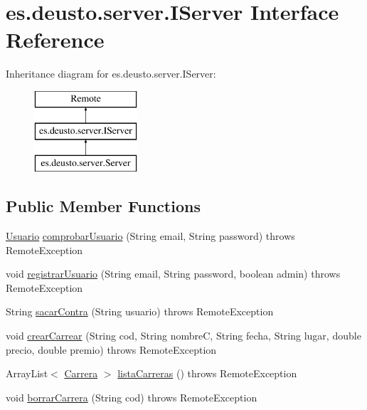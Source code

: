 \hypertarget{interfacees_1_1deusto_1_1server_1_1_i_server}{}\section{es.\+deusto.\+server.\+I\+Server Interface Reference}
\label{interfacees_1_1deusto_1_1server_1_1_i_server}
Inheritance diagram for es.\+deusto.\+server.\+I\+Server\+:\begin{figure}[H]
\begin{center}
\leavevmode
\includegraphics[height=3.000000cm]{interfacees_1_1deusto_1_1server_1_1_i_server}
\end{center}
\end{figure}
\subsection*{Public Member Functions}
\begin{DoxyCompactItemize}
\item 
\mbox{\hyperlink{classes_1_1deusto_1_1server_1_1jdo_1_1_usuario}{Usuario}} \mbox{\hyperlink{interfacees_1_1deusto_1_1server_1_1_i_server_a864d05d99ec3891208c39d8352221656}{comprobar\+Usuario}} (String email, String password)  throws Remote\+Exception
\item 
void \mbox{\hyperlink{interfacees_1_1deusto_1_1server_1_1_i_server_af6743c655c7831fa6d87e6e910bb6db4}{registrar\+Usuario}} (String email, String password, boolean admin)  throws Remote\+Exception
\item 
String \mbox{\hyperlink{interfacees_1_1deusto_1_1server_1_1_i_server_a950b819a4f67edf0ef76221dd4714d47}{sacar\+Contra}} (String usuario)  throws Remote\+Exception
\item 
void \mbox{\hyperlink{interfacees_1_1deusto_1_1server_1_1_i_server_a3cb0049dde89f2d81fcc883b19a0c6cf}{crear\+Carrear}} (String cod, String nombreC, String fecha, String lugar, double precio, double premio)  throws Remote\+Exception
\item 
Array\+List$<$ \mbox{\hyperlink{classes_1_1deusto_1_1server_1_1jdo_1_1_carrera}{Carrera}} $>$ \mbox{\hyperlink{interfacees_1_1deusto_1_1server_1_1_i_server_a13c17b07c8114d16130053aecdd455bb}{lista\+Carreras}} ()  throws Remote\+Exception
\item 
void \mbox{\hyperlink{interfacees_1_1deusto_1_1server_1_1_i_server_aaf52191bb3f870f0fcbdd58ffa7bd9c7}{borrar\+Carrera}} (String cod)  throws Remote\+Exception
\end{DoxyCompactItemize}


